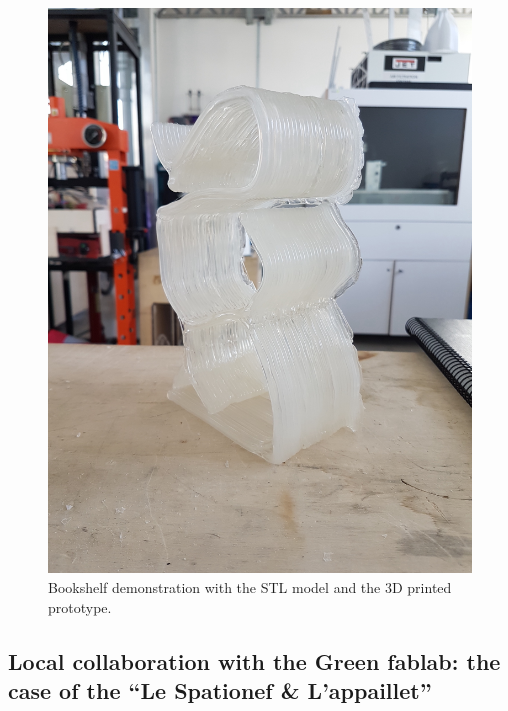 \documentclass[
  11pt,
]{article}
\begin{document}
\begin{figure}
\begin{minipage}[t]{0.42\linewidth}
{{\includegraphics{figures/demos/book/book-2.jpg}

}

}

\end{minipage}%

\caption{\label{fig-desk-final}Bookshelf demonstration with the STL
model and the 3D printed prototype.}

\end{figure}

\newpage

\hypertarget{local-collaboration-with-the-green-fablab-the-case-of-the-le-spationef-lappaillet}{%
\subsection{Local collaboration with the Green fablab: the case of the
``Le Spationef \&
L'appaillet''}\label{local-collaboration-with-the-green-fablab-the-case-of-the-le-spationef-lappaillet}}
\end{document}
